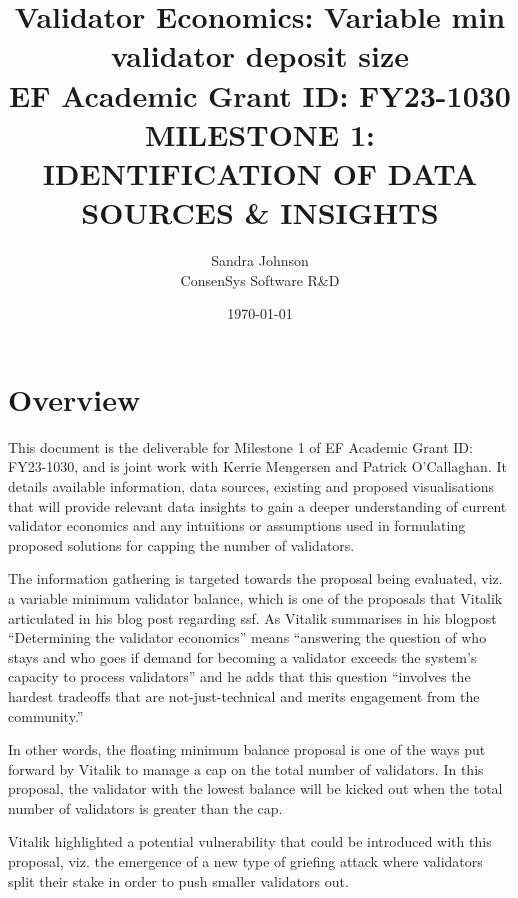 \documentclass[UTF8]{article}
\title{Validator Economics: Variable min validator deposit size\\
\vspace{4pt}
\large EF Academic Grant ID: FY23-1030\\
\vspace{16pt}
MILESTONE 1: IDENTIFICATION OF DATA SOURCES \& INSIGHTS}
\author{Sandra Johnson\\
ConsenSys Software R\&D}
\date{\today}                                           %
\begin{document}
\maketitle



\section{Overview}
This document is the deliverable for Milestone 1 of EF Academic Grant ID: FY23-1030, and is joint work with Kerrie Mengersen and Patrick O'Callaghan. It details available information, data sources, existing and proposed visualisations that will provide relevant data insights to gain a deeper understanding of current validator economics and any intuitions or assumptions used in formulating proposed solutions for capping the number of validators.

The information gathering is targeted towards the proposal being evaluated, viz. a variable minimum validator balance, which is one of the proposals that Vitalik articulated in his blog post regarding \gls{ssf}.  As Vitalik summarises in his blogpost ``Determining the validator economics'' means ``answering the question of who stays and who goes if demand for becoming a validator exceeds the system's capacity to process validators'' and he adds that this question ``involves the hardest tradeoffs that are not-just-technical and merits engagement from the community.''

In other words, the floating minimum balance proposal is one of the ways put forward by Vitalik to manage a cap on the total number of validators. In this proposal, the validator with the lowest balance will be kicked out when the total number of validators is greater than the cap. 

Vitalik highlighted a potential vulnerability that could be introduced with this proposal, viz. the emergence of a new type of griefing attack \cite{Buterin2018c} where validators split their stake in order to push smaller validators out. 
\end{document}
